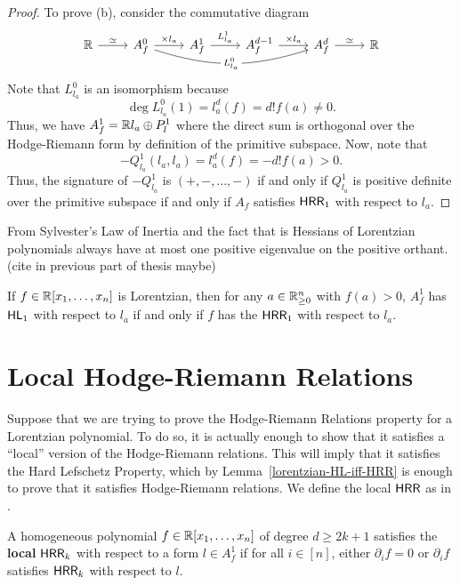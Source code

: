 \documentclass{puthesis-UG}
\begin{document}
\begin{proof}
To prove (b), consider the commutative diagram
\[\begin{tikzcd}
	{\mathbb{R}} & {A^0_f} & {A_f^1} & {A_f^{d-1}} & {A_f^d} & {\mathbb{R}}
	\arrow["{\times l_a}", from=1-2, to=1-3]
	\arrow["{L_{l_a}^1}", from=1-3, to=1-4]
	\arrow["{\times l_a}", from=1-4, to=1-5]
	\arrow["\simeq", from=1-1, to=1-2]
	\arrow["\simeq", from=1-5, to=1-6]
	\arrow["L_{l_a}^0"{description}, bend right= 18, from=1-2, to=1-5]
\end{tikzcd}\]
Note that $L_{l_a}^0$ is an isomorphism because 
\[
	\deg L_{l_a}^0 (1) = l_a^d (f)  = d! f(a) \neq 0.
\]
Thus, we have $A_f^1 = \mathbb{R} l_a \oplus P_l^1$ where the direct sum is orthogonal over the Hodge-Riemann form by definition of the primitive subspace. Now, note that 
\[
	-Q_{l_a}^1(l_a, l_a) = l_a^d (f) = -d! f(a) > 0. 
\]
Thus, the signature of $-Q_{l_a}^1$ is $(+, -, \ldots, -)$ if and only if $Q_{l_a}^1$ is positive definite over the primitive subspace if and only if $A_f$ satisfies $\mathsf{HRR}_1$ with respect to $l_a$. 
\end{proof}

From Sylvester's Law of Inertia and the fact that is Hessians of Lorentzian polynomials always have at most one positive eigenvalue on the positive orthant. (cite in previous part of thesis maybe)
\begin{lem} \label{lorentzian-HL-iff-HRR}
	If $f \in \mathbb{R} [x_1, \ldots, x_n]$ is Lorentzian, then for any $a \in \mathbb{R}_{\geq 0}^n$ with $f(a) > 0$, $A_f^1$ has $\mathsf{HL}_1$ with respect to $l_a$ if and only if $f$ has the $\mathsf{HRR}_1$ with respect to $l_a$. 
\end{lem}
\section{Local Hodge-Riemann Relations}

Suppose that we are trying to prove the Hodge-Riemann Relations property for a Lorentzian polynomial. To do so, it is actually enough to show that it satisfies a ``local'' version of the Hodge-Riemann relations. This will imply that it satisfies the Hard Lefschetz Property, which by Lemma~\ref{lorentzian-HL-iff-HRR} is enough to prove that it satisfies Hodge-Riemann relations. We define the local $\mathsf{HRR}$ as in \cite{MNY}. 

\begin{defn}
	A homogeneous polynomial $f \in \mathbb{R}[x_1, \ldots, x_n]$ of degree $d \geq 2k+1$ satisfies the \textbf{local} $\mathsf{HRR}_k$ with respect to a form $l \in A_f^1$ if for all $i \in [n]$, either $\partial_i f = 0$ or $\partial_i f$ satisfies $\mathsf{HRR}_k$ with respect to $l$. 
\end{defn}
\end{document}
